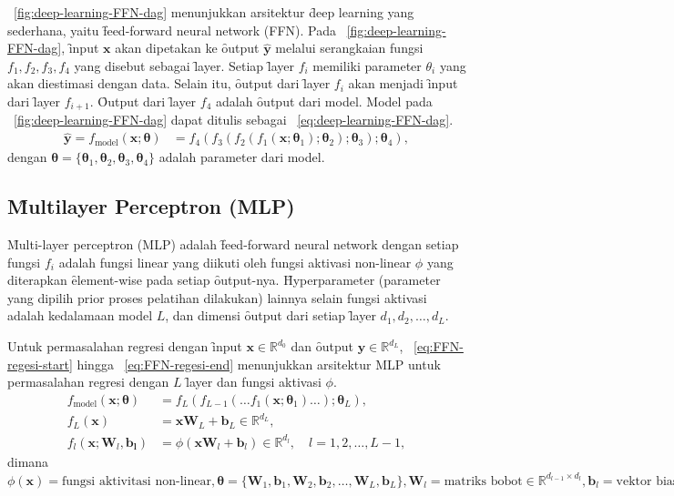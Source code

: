     \pic~\ref{fig:deep-learning-FFN-dag} menunjukkan arsitektur \f{deep learning} yang sederhana, yaitu \f{feed-forward neural network} (FFN). Pada \pic~\ref{fig:deep-learning-FFN-dag}, \f{input} $\mathbf{x}$ akan dipetakan ke \f{output} $\mathbf{\hat y}$ melalui serangkaian fungsi $f_1, f_2, f_3,f_4$ yang disebut sebagai \f{layer}. Setiap \f{layer} $f_i$ memiliki parameter $\theta_i$ yang akan diestimasi dengan data. Selain itu, \f{output} dari \f{layer} $f_i$ akan menjadi \f{input} dari \f{layer} $f_{i+1}$. \f{Output} dari \f{layer} $f_4$ adalah \f{output} dari model. Model pada \pic~\ref{fig:deep-learning-FFN-dag} dapat ditulis sebagai \equ~\ref{eq:deep-learning-FFN-dag}.
    \begin{align}
        \label{eq:deep-learning-FFN-dag}
        \mathbf{\hat y} = f_{\text{model}}(\mathbf{x}; \bm{\theta}) &= f_4(f_3(f_2(f_1(\mathbf{x}; \bm{\theta}_1); \bm{\theta}_2); \bm{\theta}_3); \bm{\theta}_4),
    \end{align}
    dengan $\bm{\theta} = \{\bm{\theta}_1, \bm{\theta}_2, \bm{\theta}_3, \bm{\theta}_4\}$ adalah parameter dari model.

    \subsection{\f{Multilayer Perceptron} (MLP)}

    \f{Multi-layer perceptron} (MLP) adalah \f{feed-forward neural network} dengan setiap fungsi $f_i$ adalah fungsi linear yang diikuti oleh fungsi aktivasi non-linear $\phi$  yang diterapkan \f{element-wise} pada setiap \f{output}-nya. \f{Hyperparameter} (parameter yang dipilih prior proses pelatihan dilakukan) lainnya selain fungsi aktivasi adalah kedalamaan model $L$, dan dimensi \f{output} dari setiap \f{layer} $d_1, d_2, \dots, d_L$.

    Untuk permasalahan regresi dengan \f{input} $\mathbf{x}\in \mathbb{R}^{d_0}$ dan \f{output} $\mathbf{y} \in \mathbb{R}^{d_L}$, \equ~\ref{eq:FFN-regesi-start} hingga \equ~\ref{eq:FFN-regesi-end} menunjukkan arsitektur MLP untuk permasalahan regresi dengan $L$ \f{layer} dan fungsi aktivasi $\phi$.
    \begin{align}
        \label{eq:FFN-regesi-start}
        f_{\text{model}}(\mathbf{x};\bm{\theta}) &= f_L(f_{L-1}(\dots f_1(\mathbf{x};\bm{\theta}_1)\dots); \bm{\theta}_L), \\
        f_L(\mathbf{x}) &= \mathbf{x} \mathbf{W}_L + \mathbf{b}_L \in \mathbb{R}^{d_L}, \\
        f_l(\mathbf{x};\mathbf{W}_l, \mathbf{b_l}) &= \phi( \mathbf{x} \mathbf{W}_l + \mathbf{b}_l) \in \mathbb{R}^{d_l}, \quad l = 1, 2, \dots, L-1,
        \label{eq:FFN-regesi-end}
    \end{align} 
    dimana $\phi(\mathbf{x})= \text{fungsi aktivitasi non-linear},
        \bm{\theta} = \{\mathbf{W}_1, \mathbf{b}_1, \mathbf{W}_2, \mathbf{b}_2, \dots, \mathbf{W}_L, \mathbf{b}_L\},
        \mathbf{W}_l = \text{matriks bobot}  \in \mathbb{R}^{d_{l-1} \times d_l},
        \mathbf{b}_l = \text{vektor bias} \in \mathbb{R}^{d_l}.$

